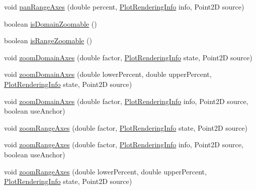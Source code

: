 \begin{DoxyCompactItemize}
\item 
void \mbox{\hyperlink{classorg_1_1jfree_1_1chart_1_1plot_1_1_category_plot_aed70dddde4f4e4796b966e114e958eb9}{pan\+Range\+Axes}} (double percent, \mbox{\hyperlink{classorg_1_1jfree_1_1chart_1_1plot_1_1_plot_rendering_info}{Plot\+Rendering\+Info}} info, Point2D source)
\item 
boolean \mbox{\hyperlink{classorg_1_1jfree_1_1chart_1_1plot_1_1_category_plot_a6a2b57b6fac55866636c24ea8fa92469}{is\+Domain\+Zoomable}} ()
\item 
boolean \mbox{\hyperlink{classorg_1_1jfree_1_1chart_1_1plot_1_1_category_plot_ae3587c02157e69eeb8909513982e3d23}{is\+Range\+Zoomable}} ()
\item 
void \mbox{\hyperlink{classorg_1_1jfree_1_1chart_1_1plot_1_1_category_plot_ac5d755df917d1dc10019555e312d9bf4}{zoom\+Domain\+Axes}} (double factor, \mbox{\hyperlink{classorg_1_1jfree_1_1chart_1_1plot_1_1_plot_rendering_info}{Plot\+Rendering\+Info}} state, Point2D source)
\item 
void \mbox{\hyperlink{classorg_1_1jfree_1_1chart_1_1plot_1_1_category_plot_a5d06327bbfefc37d4178546762057477}{zoom\+Domain\+Axes}} (double lower\+Percent, double upper\+Percent, \mbox{\hyperlink{classorg_1_1jfree_1_1chart_1_1plot_1_1_plot_rendering_info}{Plot\+Rendering\+Info}} state, Point2D source)
\item 
void \mbox{\hyperlink{classorg_1_1jfree_1_1chart_1_1plot_1_1_category_plot_a65485f04d307490985a140fc81739066}{zoom\+Domain\+Axes}} (double factor, \mbox{\hyperlink{classorg_1_1jfree_1_1chart_1_1plot_1_1_plot_rendering_info}{Plot\+Rendering\+Info}} info, Point2D source, boolean use\+Anchor)
\item 
void \mbox{\hyperlink{classorg_1_1jfree_1_1chart_1_1plot_1_1_category_plot_a7f3fe50fa325cb0320e7c718b5c1fde9}{zoom\+Range\+Axes}} (double factor, \mbox{\hyperlink{classorg_1_1jfree_1_1chart_1_1plot_1_1_plot_rendering_info}{Plot\+Rendering\+Info}} state, Point2D source)
\item 
void \mbox{\hyperlink{classorg_1_1jfree_1_1chart_1_1plot_1_1_category_plot_a50f9eeb30e6ce295c065e8871797bd2b}{zoom\+Range\+Axes}} (double factor, \mbox{\hyperlink{classorg_1_1jfree_1_1chart_1_1plot_1_1_plot_rendering_info}{Plot\+Rendering\+Info}} info, Point2D source, boolean use\+Anchor)
\item 
void \mbox{\hyperlink{classorg_1_1jfree_1_1chart_1_1plot_1_1_category_plot_ace3bbe4acfb4b8d7ecdc91c0456e4ce1}{zoom\+Range\+Axes}} (double lower\+Percent, double upper\+Percent, \mbox{\hyperlink{classorg_1_1jfree_1_1chart_1_1plot_1_1_plot_rendering_info}{Plot\+Rendering\+Info}} state, Point2D source)

\end{DoxyCompactItemize}
